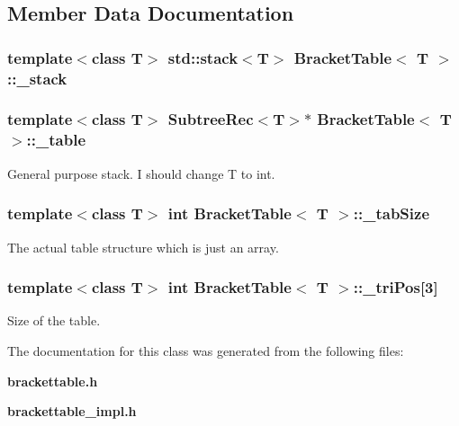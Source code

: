 \subsection{Member Data Documentation}
\subsubsection{\setlength{\rightskip}{0pt plus 5cm}template$<$class T$>$ std::stack$<$T$>$ {\bf Bracket\-Table}$<$ T $>$::{\bf \_\-stack}\hspace{0.3cm}{\tt  [protected]}}\label{classBracketTable_p0}


\subsubsection{\setlength{\rightskip}{0pt plus 5cm}template$<$class T$>$ {\bf Subtree\-Rec}$<$T$>$$\ast$ {\bf Bracket\-Table}$<$ T $>$::{\bf \_\-table}\hspace{0.3cm}{\tt  [protected]}}\label{classBracketTable_p1}


General purpose stack. I should change T to int. 

\subsubsection{\setlength{\rightskip}{0pt plus 5cm}template$<$class T$>$ int {\bf Bracket\-Table}$<$ T $>$::{\bf \_\-tab\-Size}\hspace{0.3cm}{\tt  [protected]}}\label{classBracketTable_p2}


The actual table structure which is just an array. 

\subsubsection{\setlength{\rightskip}{0pt plus 5cm}template$<$class T$>$ int {\bf Bracket\-Table}$<$ T $>$::{\bf \_\-tri\-Pos}[3]\hspace{0.3cm}{\tt  [protected]}}\label{classBracketTable_p3}


Size of the table. 



The documentation for this class was generated from the following files:\begin{CompactItemize}
\item 
{\bf brackettable.h}\item 
{\bf brackettable\_\-impl.h}\end{CompactItemize}
